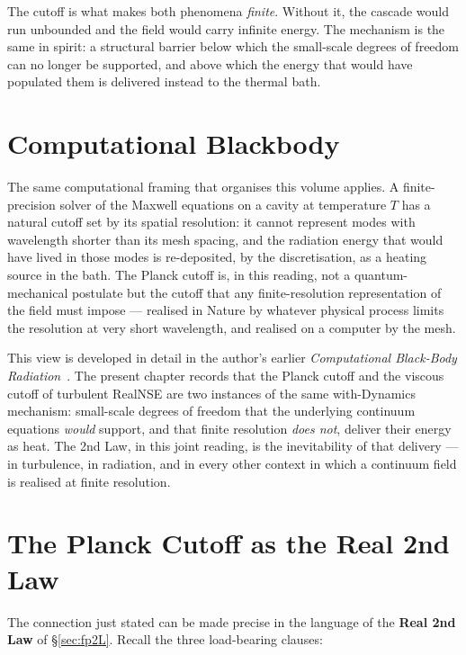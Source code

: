 The cutoff is what makes both phenomena \emph{finite}. Without it, the
cascade would run unbounded and the field would carry infinite energy.
The mechanism is the same in spirit: a structural barrier below which
the small-scale degrees of freedom can no longer be supported, and
above which the energy that would have populated them is delivered
instead to the thermal bath.

\section{Computational Blackbody}

The same computational framing that organises this volume applies. A
finite-precision solver of the Maxwell equations on a cavity at
temperature $T$ has a natural cutoff set by its spatial resolution: it
cannot represent modes with wavelength shorter than its mesh spacing,
and the radiation energy that would have lived in those modes is
re-deposited, by the discretisation, as a heating source in the bath.
The Planck cutoff is, in this reading, not a quantum-mechanical
postulate but the cutoff that any finite-resolution representation of
the field must impose --- realised in Nature by whatever physical
process limits the resolution at very short wavelength, and realised
on a computer by the mesh.

This view is developed in detail in the author's earlier
\emph{Computational Black-Body Radiation}~\cite{blackbody}. The
present chapter records that the Planck cutoff and the viscous cutoff
of turbulent RealNSE are two instances of the same with-Dynamics
mechanism: small-scale degrees of freedom that the underlying
continuum equations \emph{would} support, and that finite resolution
\emph{does not}, deliver their energy as heat. The 2nd Law, in this
joint reading, is the inevitability of that delivery --- in
turbulence, in radiation, and in every other context in which a
continuum field is realised at finite resolution.

\section{The Planck Cutoff as the Real 2nd Law}\label{sec:planck-fp2L}

The connection just stated can be made precise in the language of the
\textbf{Real 2nd Law} of \S\ref{sec:fp2L}. Recall the three load-bearing
clauses:

